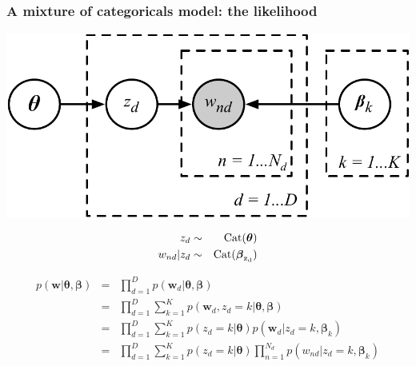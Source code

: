 \begin{frame}
\frametitle{A mixture of categoricals model: the likelihood}

\begin{minipage}{0.7\linewidth}
\centerline{\includegraphics[width=0.7\linewidth]{mix_categorical_model}}
\end{minipage}
\begin{minipage}{0.29\linewidth}
\begin{eqnarray*}
z_d & \sim & \rm{Cat}(\boldsymbol{\theta})\\
w_{nd} | z_d & \sim & \rm{Cat}(\boldsymbol{\beta}_{z_d})
\end{eqnarray*}
\end{minipage}

\begin{eqnarray*}
p(\mathbf{w}|\boldsymbol{\theta},\boldsymbol{\beta}) &=& \prod_{d=1}^D
p(\mathbf{w}_d|\boldsymbol{\theta},\boldsymbol{\beta}) \\
&=& \prod_{d=1}^D \sum_{k=1}^K
p(\mathbf{w}_d,z_d=k|\boldsymbol{\theta},\boldsymbol{\beta}) \\
&=&  \prod_{d=1}^D \sum_{k=1}^K p(z_d=k|\boldsymbol{\theta}) 
p(\mathbf{w}_d | z_d=k, \boldsymbol{\beta}_k) \\
&=&   \prod_{d=1}^D \sum_{k=1}^K p(z_d=k|\boldsymbol{\theta}) 
\prod_{n=1}^{N_d} p(w_{nd} | z_d=k, \boldsymbol{\beta}_k)
\end{eqnarray*}

\end{frame}

